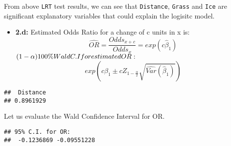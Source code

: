 \documentclass[]{article}
\newenvironment{Shaded}{\begin{snugshade}}{\end{snugshade}}
\newcommand{\CharTok}[1]{\textcolor[rgb]{0.31,0.60,0.02}{#1}}
\newcommand{\CommentTok}[1]{\textcolor[rgb]{0.56,0.35,0.01}{\textit{#1}}}
\newcommand{\DecValTok}[1]{\textcolor[rgb]{0.00,0.00,0.81}{#1}}
\newcommand{\FloatTok}[1]{\textcolor[rgb]{0.00,0.00,0.81}{#1}}
\newcommand{\KeywordTok}[1]{\textcolor[rgb]{0.13,0.29,0.53}{\textbf{#1}}}
\newcommand{\NormalTok}[1]{#1}
\newcommand{\OperatorTok}[1]{\textcolor[rgb]{0.81,0.36,0.00}{\textbf{#1}}}
\newcommand{\StringTok}[1]{\textcolor[rgb]{0.31,0.60,0.02}{#1}}
\providecommand{\tightlist}{%
  \setlength{\itemsep}{0pt}\setlength{\parskip}{0pt}}
\begin{document}
From above \texttt{LRT} test results, we can see that \texttt{Distance},
\texttt{Grass} and \texttt{Ice} are significant explanatory variables
that could explain the logisitc model.

\begin{itemize}
\tightlist
\item
  \textbf{2.d:} Estimated Odds Ratio for a change of c units in x is: \[
  \widehat {OR} = \frac{Odds_{x+c}}{Odds_x} = exp(c\hat \beta_1)
  \]
  \((1-\alpha) 100 \% \space Wald \space C.I \space for \space estimated \space OR :\)
  \[
   exp(c\beta_1 \pm c Z_{1-\frac{\alpha}{2}} \sqrt{\widehat{Var}(\hat \beta_1)})
  \]
\end{itemize}

\begin{Shaded}
\end{Shaded}

\begin{verbatim}
##  Distance 
## 0.8961929
\end{verbatim}

Let us evaluate the Wald Confidence Interval for OR.

\begin{Shaded}
\end{Shaded}

\begin{verbatim}
## 95% C.I. for OR:
##  -0.1236869 -0.09551228
\end{verbatim}

\begin{Shaded}
\end{Shaded}
\end{document}
